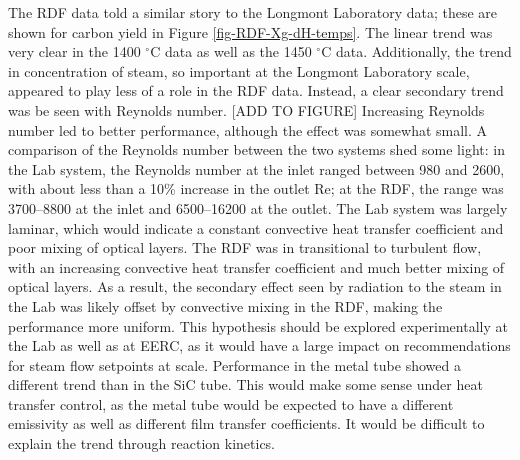\documentclass[11pt,twocolumn]{article}
\begin{document}
The RDF data told a similar story to the Longmont Laboratory data; these are shown for carbon yield in Figure \ref{fig-RDF-Xg-dH-temps}.  The linear trend was very clear in the 1400 $^{\circ}$C data as well as the 1450 $^{\circ}$C data.  Additionally, the trend in concentration of steam, so important at the Longmont Laboratory scale, appeared to play less of a role in the RDF data.  Instead, a clear secondary trend was be seen with Reynolds number. [ADD TO FIGURE] Increasing Reynolds number led to better performance, although the effect was somewhat small.  A comparison of the Reynolds number between the two systems shed some light: in the Lab system, the Reynolds number at the inlet ranged between 980 and 2600, with about less than a 10\% increase in the outlet Re; at the RDF, the range was 3700--8800 at the inlet and 6500--16200 at the outlet.  The Lab system was largely laminar, which would indicate a constant convective heat transfer coefficient and poor mixing of optical layers.  The RDF was in transitional to turbulent flow, with an increasing convective heat transfer coefficient and much better mixing of optical layers.  As a result, the secondary effect seen by radiation to the steam in the Lab was likely offset by convective mixing in the RDF, making the performance more uniform.  This hypothesis should be explored experimentally at the Lab as well as at EERC, as it would have a large impact on recommendations for steam flow setpoints at scale.  Performance in the metal tube showed a different trend than in the SiC tube.  This would make some sense under heat transfer control, as the metal tube would be expected to have a different emissivity as well as different film transfer coefficients.  It would be difficult to explain the trend through reaction kinetics.
\end{document}
